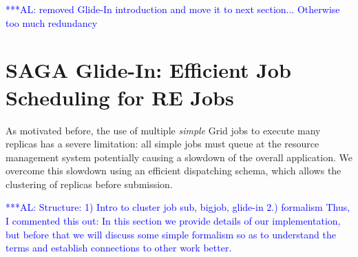 \documentclass{rspublic}
\newcommand{\alnote}[1]{ {\textcolor{blue} { ***AL: #1 }}}
\newcommand{\jhanote}[1]{ {\textcolor{red} { ***SJ: #1 }}}
\newcommand{\alnote}[1]{}
\newcommand{\jhanote}[1]{}
\begin{document}
\alnote{removed Glide-In introduction and move it to next section... Otherwise too much
redundancy}




\section{SAGA Glide-In: Efficient Job Scheduling for RE Jobs}
\label{sec:glidein}

As motivated before, the use of multiple {\it simple} Grid jobs to
execute many replicas has a severe limitation: all simple jobs
must queue at the resource management system potentially causing a
slowdown of the overall application. We overcome this slowdown 
using an efficient dispatching schema, which allows the clustering
of replicas before submission. 


\alnote{Structure: 1) Intro to cluster job sub, bigjob, glide-in 2.) formalism
Thus, I commented this out:
In this section we provide details of our implementation, but
before that we will discuss some simple formalism so as to understand
the terms and establish connections to other work better.
}
\end{document}
